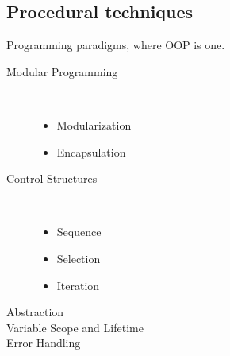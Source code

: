 \documentclass[11pt,journal,compsoc]{IEEEtran}
\begin{document}
\subsection{Procedural techniques}

Programming paradigms, where OOP is one.

\begin{description}
    \item[Modular Programming] ~

    \begin{itemize}
        \item Modularization
        \item Encapsulation
    \end{itemize}

    \item[Control Structures] ~

    \begin{itemize}
        \item Sequence
        \item Selection
        \item Iteration
    \end{itemize}

    \item[Abstraction] 

    \item[Variable Scope and Lifetime] 

    \item[Error Handling] 
\end{description}
\end{document}
